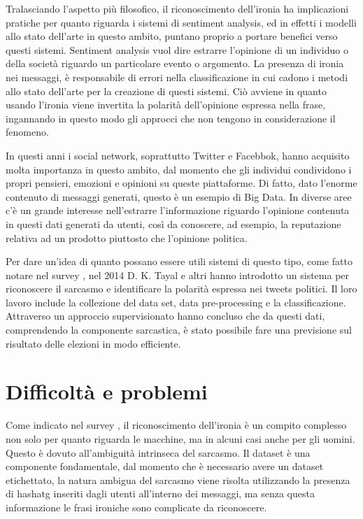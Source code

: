 \documentclass[oneside]{book}
\begin{document}
Tralasciando l'aspetto più filosofico, il riconoscimento dell'ironia ha implicazioni pratiche per quanto riguarda i sistemi di sentiment analysis, ed in effetti i modelli allo stato dell'arte in questo ambito, puntano proprio a portare benefici verso questi sistemi. Sentiment analysis vuol dire estrarre l'opinione di un individuo o della società riguardo un particolare evento o argomento. La presenza di ironia nei messaggi, è responsabile di errori nella classificazione in cui cadono i metodi allo stato dell'arte per la creazione di questi sistemi. Ciò avviene in quanto usando l'ironia viene invertita la polarità dell'opinione espressa nella frase, ingannando in questo modo gli approcci che non tengono in considerazione il fenomeno.

In questi anni i social network, soprattutto Twitter e Facebbok, hanno acquisito molta importanza in questo ambito, dal momento che gli individui condividono i propri pensieri, emozioni e opinioni su queste piattaforme. Di fatto, dato l'enorme contenuto di messaggi generati, questo è un esempio di Big Data. In diverse aree c'è un grande interesse nell'estrarre l'informazione riguardo l'opinione contenuta in questi dati generati da utenti, così da conoscere, ad esempio, la reputazione relativa ad un prodotto piuttosto che l'opinione politica.

Per dare un'idea di quanto possano essere utili sistemi di questo tipo, come fatto notare nel survey \cite{survey1}, nel 2014 D. K. Tayal e altri \cite{political} hanno introdotto un sistema per riconoscere il sarcasmo e identificare la polarità espressa nei tweets politici. Il loro lavoro include la collezione del data set, data pre-processing e la classificazione. Attraverso un approccio supervisionato hanno concluso che da questi dati, comprendendo la componente sarcastica, è stato possibile fare una previsione sul risultato delle elezioni in modo efficiente.

\section{Difficoltà e problemi}
Come indicato nel survey \cite{survey3}, il riconoscimento dell'ironia è un compito complesso non solo per quanto riguarda le macchine, ma in alcuni casi anche per gli uomini. Questo è dovuto all'ambiguità intrinseca del sarcasmo. Il dataset è una componente fondamentale, dal momento che è necessario avere un dataset etichettato, la natura ambigua del sarcasmo viene risolta utilizzando la presenza di hashatg inseriti dagli utenti all'interno dei messaggi, ma senza questa informazione le frasi ironiche sono complicate da riconoscere.
\end{document}
